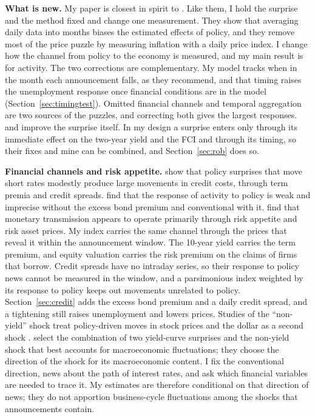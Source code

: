 \documentclass[11pt]{article}
\begin{document}
\textbf{What is new.} My paper is closest in spirit to \citet{jacobson2026}. Like them, I hold the surprise and the method fixed and change one measurement. They show that averaging daily data into months biases the estimated effects of policy, and they remove most of the price puzzle by measuring inflation with a daily price index. I change how the channel from policy to the economy is measured, and my main result is for activity. The two corrections are complementary. My model tracks when in the month each announcement falls, as they recommend, and that timing raises the unemployment response once financial conditions are in the model (Section~\ref{sec:timingtest}). Omitted financial channels and temporal aggregation are two sources of the puzzles, and correcting both gives the largest responses. \citet{bauer2023} and \citet{jarocinski2020} improve the surprise itself. In my design a surprise enters only through its immediate effect on the two-year yield and the FCI and through its timing, so their fixes and mine can be combined, and Section~\ref{sec:rob} does so.

\textbf{Financial channels and risk appetite.} \citet{gertler2015} show that policy surprises that move short rates modestly produce large movements in credit costs, through term premia and credit spreads. \citet{caldara2019} find that the response of activity to policy is weak and imprecise without the excess bond premium and conventional with it. \citet{bauer2026} find that monetary transmission appears to operate primarily through risk appetite and risk asset prices. My index carries the same channel through the prices that reveal it within the announcement window. The 10-year yield carries the term premium, and equity valuation carries the risk premium on the claims of firms that borrow. Credit spreads have no intraday series, so their response to policy news cannot be measured in the window, and a parsimonious index weighted by its response to policy keeps out movements unrelated to policy. Section~\ref{sec:credit} adds the excess bond premium and a daily credit spread, and a tightening still raises unemployment and lowers prices. Studies of the ``non-yield'' shock treat policy-driven moves in stock prices and the dollar as a second shock \citep{bauer2026,boehm2024}. \citet{boehm2026} select the combination of two yield-curve surprises and the non-yield shock that best accounts for macroeconomic fluctuations; they choose the direction of the shock for its macroeconomic content. I fix the conventional direction, news about the path of interest rates, and ask which financial variables are needed to trace it. My estimates are therefore conditional on that direction of news; they do not apportion business-cycle fluctuations among the shocks that announcements contain.
\end{document}
